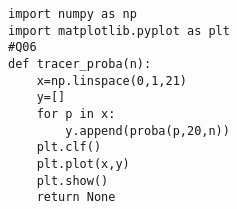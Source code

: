 \begin{lstlisting}
import numpy as np
import matplotlib.pyplot as plt
#Q06
def tracer_proba(n):
    x=np.linspace(0,1,21)
    y=[]
    for p in x:
        y.append(proba(p,20,n))
    plt.clf()
    plt.plot(x,y)
    plt.show()
    return None
\end{lstlisting}

%
%
%
%
%
%
%
%
%
%
%
%
%





